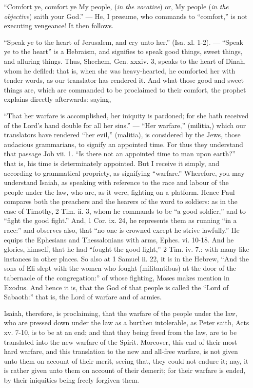 “Comfort ye, comfort ye My people, (\emph{in the vocative}) or, My people (\emph{in the objective}) saith your God.” — He, I presume, who commands to “comfort,” is not executing vengeance! It then follows.

“Speak ye to the heart of Jerusalem, and cry unto her.” (Isa. xl. 1-2). — “Speak ye to the heart” is a Hebraism, and signifies to speak good things, sweet things, and alluring things. Thus, Shechem, Gen. xxxiv. 3, speaks to the heart of Dinah, whom he defiled: that is, when she was heavy-hearted, he comforted her with tender words, as our translator has rendered it. And what those good and sweet things are, which are commanded to be proclaimed to their comfort, the prophet explains directly afterwards: saying,

“That her warfare is accomplished, her iniquity is pardoned; for she hath received of the Lord’s hand double for all her sins.” — “Her warfare,” (militia,) which our translators have rendered “her evil,” (malitia), is considered by the Jews, those audacious grammarians, to signify an appointed time. For thus they understand that passage Job vii. 1. “Is there not an appointed time to man upon earth?” that is, his time is determinately appointed. But I receive it simply, and according to grammatical propriety, as signifying “warfare.” Wherefore, you may understand Isaiah, as speaking with reference to the race and labour of the people under the law, who are, as it were, fighting on a platform. Hence Paul compares both the preachers and the hearers of the word to soldiers: as in the case of Timothy, 2 Tim. ii. 3, whom he commands to be “a good soldier,” and to “fight the good fight.” And, 1 Cor. ix. 24, he represents them as running “in a race:” and observes also, that “no one is crowned except he strive lawfully.” He equips the Ephesians and Thessalonians with arms, Ephes. vi. 10-18. And he glories, himself, that he had “fought the good fight,” 2 Tim. iv. 7.: with many like instances in other places. So also at 1 Samuel ii. 22, it is in the Hebrew, “And the sons of Eli slept with the women who fought (militantibus) at the door of the tabernacle of the congregation:” of whose fighting, Moses makes mention in Exodus. And hence it is, that the God of that people is called the “Lord of Sabaoth:” that is, the Lord of warfare and of armies.

Isaiah, therefore, is proclaiming, that the warfare of the people under the law, who are pressed down under the law as a burthen intolerable, as Peter saith, Acts xv. 7-10, is to be at an end; and that they being freed from the law, are to be translated into the new warfare of the Spirit. Moreover, this end of their most hard warfare, and this translation to the new and all-free warfare, is not given unto them on account of their merit, seeing that, they could not endure it; nay, it is rather given unto them on account of their demerit; for their warfare is ended, by their iniquities being freely forgiven them.

